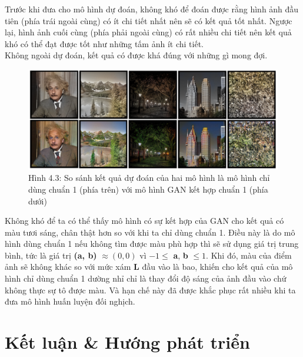 \documentclass[a4paper]{article}
\begin{document}
\noindent
Trước khi đưa cho mô hình dự đoán, không khó để đoán được rằng hình ảnh đầu tiên (phía trái ngoài cùng) có ít chi tiết nhất nên sẽ có kết quả tốt nhất. Ngược lại, hình ảnh cuối cùng (phía phải ngoài cùng) có rất nhiều chi tiết nên kết quả khó có thể đạt được tốt như những tấm ảnh ít chi tiết.\\
Không ngoài dự đoán, kết quả có được khá đúng với những gì mong đợi.

\begin{figure}[h!]
\centering
\includegraphics[width=16cm]{images/4_3.PNG}
\caption{Hình 4.3: So sánh kết quả dự đoán của hai mô hình là mô hình chỉ dùng chuẩn 1 (phía trên) với mô hình GAN kết hợp chuẩn 1 (phía dưới)}
\end{figure}

\noindent
Không khó để ta có thể thấy mô hình có sự kết hợp của GAN cho kết quả có màu tươi sáng, chân thật hơn so với khi ta chỉ dùng chuẩn 1. Điều này là do mô hình dùng chuẩn 1 nếu không tìm được màu phù hợp thì sẽ sử dụng giá trị trung bình, tức là giá trị \textbf{(a, b)} $\approx (0, 0)$ vì $-1 \le$ \textbf{a}, \textbf{b} $\le 1$. Khi đó, màu của điểm ảnh sẽ không khác so với mức xám \textbf{L} đầu vào là bao, khiến cho kết quả của mô hình chỉ dùng chuẩn 1 dường nhỉ chỉ là thay đổi độ sáng của ảnh đầu vào chứ không thực sự tô được màu. Và hạn chế này đã được khắc phục rất nhiều khi ta đưa mô hình huấn luyện đối nghịch.

\section{Kết luận \& Hướng phát triển}
\end{document}

